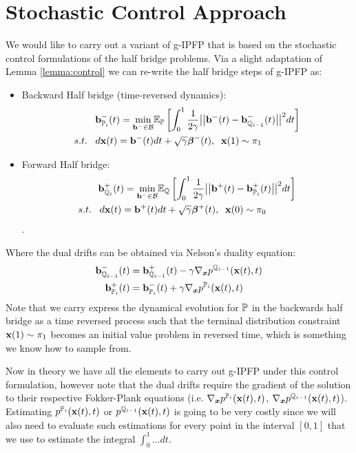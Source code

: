 \documentclass[a4paper,12pt,twoside,openright]{report}
\theoremstyle{definition}
\begin{document}
\section{Stochastic Control Approach}

We would like to carry out a variant of g-IPFP that is based on the stochastic control formulations of the half bridge problems. Via a slight adaptation of Lemma \ref{lemma:control} we can re-write the half bridge steps of g-IPFP as:
\begin{itemize}
\item Backward Half bridge (time-reversed dynamics): 
\begin{align} \label{eq:controlled_haalf_bridge_forward}
  \rvb^{-}_{\P_{i}}(t) = \min_{\rvb^{-} \in \calB }  &\E_\P\left[\int_0^1 \frac{1}{2\gamma}\big|\big|\rvb^{-}(t) -\rvb^{-}_{\Q_{i-1}}(t) \big|\big|^2 dt\right] \nonumber \\
    s.t.\;\;\; d\rvx(t) = \rvb^{-}(t) &dt + \sqrt{\gamma} \rvw^{-}(t), \;\; \rvx(1) \sim \pi_1
\end{align}
\item Forward Half bridge:
\begin{align} \label{eq:controlled_half_bridge_backward}
   \rvb^{+}_{\Q_{i}}(t) =\min_{\rvb^{-} \in \calB } & \E_\Q\left[\int_0^1 \frac{1}{2\gamma}\big|\big|\rvb^{+}(t) -\rvb^{+}_{\P_{i}}(t)\big|\big|^2 dt\right] \nonumber \\
    s.t.\;\;\; d\rvx(t) = \rvb^{+}(t) &dt + \sqrt{\gamma} \rvw^{+}(t), \;\; \rvx(0) \sim \pi_0
\end{align}.
\end{itemize}
Where the dual drifts can be obtained via Nelson's duality equation:
\begin{align*}
      \rvb^{-}_{\Q_{i-1}}(t)   &=\rvb^{+}_{\Q_{i-1}}(t) -\gamma\nabla_{\vx} p^{\Q_{i-1}}(\rvx(t), t) \\
    \rvb^{+}_{\P_{i}}(t) &=  \rvb^{-}_{\P_{i}}(t) +\gamma\nabla_{\vx} p^{\P_{i}}(\rvx(t), t)
\end{align*}
Note that we carry express the dynamical evolution for $\P$ in the backwards half bridge as a time reversed process \citep{pavon1991free, nelson1967dynamical} such that the terminal distribution constraint $\rvx(1) \sim \pi_1$ becomes an initial value problem in reversed time, which is something we know how to sample from. 

Now in theory we have all the elements to carry out g-IPFP under this control formulation, however note that the dual drifts require the gradient of the solution to their respective Fokker-Plank equations (i.e. $\nabla_{\vx} p^{\P_{i}}(\rvx(t), t)$, $\nabla_{\vx} p^{\Q_{i-1}}(\rvx(t), t)$). Estimating $p^{\P_{i}}(\rvx(t), t)$ or $p^{\Q_{i-1}}(\rvx(t), t)$ is going to be very costly since we  will also need to evaluate such estimations for every point in the interval $[0,1]$ that we use to estimate the integral $\int_0^1 \hdots dt$.
\end{document}

